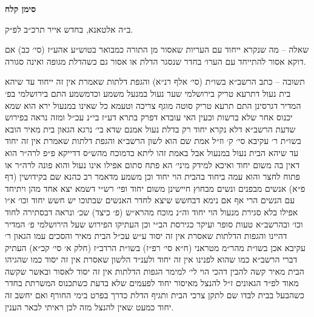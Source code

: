 \documentclass[12pt, openany]{book}
\newcommand{\chapname}{}
\newcommand{\newchap}[1]{
	\addcontentsline{toc}{chapter}{#1}
	\renewcommand{\chapname}{#1}
		\begin{center}
			\textbf{%
\fontsize{16pt}{16pt}\selectfont
				#1}
		\end{center}
}
\begin{document}
\newchap{סימן קלח}
\begin{multicols}{2}
ב״ה אלטאנא, בחדש אייר תרכ״ב לפ״ק.\\\vspace{0pt}

שאלה – מה שנקרא ייחוד עם העריות שאסור מן התורה כמבואר בטוש״ע אהע״ז (סי׳ כב) אם דוקא אסור להתייחד עם הערו׳ בחדר שנסגר הדלת או אסור גם כשהדלת מגופה ואינה סגורה.\\\vspace{0pt}

תשובה – כתב הרשב״א בשו״ת (סי׳ אלף רנ״א) והגפת דלתות שאמרת אין זה ייחוד עד שיהא בית נעול דתרעא טריק בירושלמי שער נעול במנעל משמע וכדמשמע התם בירושלמי בפ׳ המדיר דגרסינן התם תרעא טריק סוטה מוגף צריכה וטעמא כל שאינו במנעול ירא הוא שמא יכנוס אחר שלא ברשות וכעין האי עובדא דפרק בתרא דע״ז בי״נ עכ״ל ומזה נראה בפירוש שדעת הרשב״א דלא נקרא יחוד רק בדלת נעול אמנם שדא בי׳ נרגא הגאון בית מאיר הובא בשו״ת ר׳ עקיבא סי׳ ק׳ וז״ל אמת שם הוא לשון הרשב״א והגפת דלתות שאמרת אין זה יחוד עד שיהא הבית נעול במנעול אבל באמת זהו ליתא כדמוכח מהש״ס דדייקא פ״פ לרה״ר הוא דאין בה משום יחוד ואיכא למידק מיני׳ הא פתח סתום אפילו אינו נעול והוא פונה לרה״ר או פתוח לחצר והוא עמה ביחוד בהבית הוי יחוד וכן משמע מדאמר רב כהנא שם בקידושין (דף פ״א) אנשים מבפנים ונשים מבחוץ חיישינן משום יחוד ופי׳ רש״י דשמא יצא אחד מהן ויתיחד עם הנשים הרי אף אם נימא דבחשש שיצא לחדר האנשים שבתוכו יש חשש יחוד וכו׳ א״ו אפילו בלא סגירת מנעול הוי יחוד וה״נ מוכח מהרא״ש (פ׳ כיצד) שכ׳ ונראה דבסתירה לחוד וכו׳ ובהרשב״א טעות סופר ועיקר כגירסת הב״י וכן העתיקו הפירוש שעל הירושלמי פ׳ המדיר דהיינו והגפות הדלתות שאסרת אין זה יסוד ע״ש עכ״ל הבית מאיר והסכים עמו הגאון ר׳ עקיבא אכן בשו״ת מהר״מ מטראני (ח״א סי׳ רפ״ז) בשו״ת הרדב״ז (חלק א׳ סי׳ קכ״א) העתיק דברי הרשב״א כמו שהוא לפנינו אין זה יחוד ולענ״ד הלשון שאסרת אין זה יסוד כמו שהגיהו הבית מאיר קשה להבין דהכי הוי לי׳ למימר הגפות הדלתות אין זה יסוד לאסור ובאשר שקשה מאוד לפ״ד הגאונים ז״ל להנצל מאיסור יחוד לפעמים שלא בדעת כשתכנוס המשרתת בחדר כשהבעל בבית לבדו שם לתקן צרכי הבית ותגיף הדלת כדרך בפרט בימי החורף ואם יחשב זה יחוד כמעט שאין להנצל מזה לכן ראיתי לבאר הענין.\\\vspace{0pt}


\end{multicols}
\end{document}

